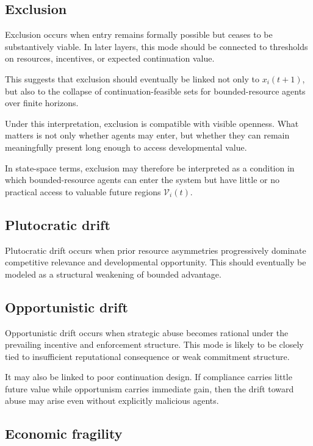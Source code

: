 \documentclass[11pt]{article}
\begin{document}
\subsection{Exclusion}

Exclusion occurs when entry remains formally possible but ceases to be substantively viable. In later layers, this mode should be connected to thresholds on resources, incentives, or expected continuation value.

This suggests that exclusion should eventually be linked not only to \(x_i(t+1)\), but also to the collapse of continuation-feasible sets for bounded-resource agents over finite horizons.

Under this interpretation, exclusion is compatible with visible openness. What matters is not only whether agents may enter, but whether they can remain meaningfully present long enough to access developmental value.

In state-space terms, exclusion may therefore be interpreted as a condition in which bounded-resource agents can enter the system but have little or no practical access to valuable future regions \(\mathcal{V}_i(t)\).

\subsection{Plutocratic drift}

Plutocratic drift occurs when prior resource asymmetries progressively dominate competitive relevance and developmental opportunity. This should eventually be modeled as a structural weakening of bounded advantage.

\subsection{Opportunistic drift}

Opportunistic drift occurs when strategic abuse becomes rational under the prevailing incentive and enforcement structure. This mode is likely to be closely tied to insufficient reputational consequence or weak commitment structure.

It may also be linked to poor continuation design. If compliance carries little future value while opportunism carries immediate gain, then the drift toward abuse may arise even without explicitly malicious agents.

\subsection{Economic fragility}
\end{document}
